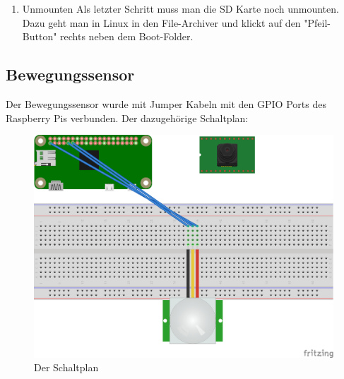 \begin{enumerate}
\begin{listing}
\begin{code}[firstnumber=last]{python}
            while sendmail() != True:
                try:
                    print("Trying ... ")
                except KeyboardInterrupt as e:
                    print("\nUser interrupt detected ...")
                    print("Email was not sent. Please check your connectivity!")
            break
        \end{code}
        \caption{Python script um eine email zu senden}
    \end{listing}

    Dieses Python File muss auch noch auf \textit{executable} gesetzt werden. Dazu:

    \begin{listing}
        \begin{code}[firstnumber=last]{sh}
            sudo chmod +x sendIP.py
        \end{code}
        \caption{Python datei als executable markieren}
    \end{listing}

    \item Unmounten
    Als letzter Schritt muss man die SD Karte noch unmounten. Dazu geht man in Linux in den File-Archiver und klickt auf den "Pfeil-Button" rechts neben dem Boot-Folder.
\end{enumerate}

\subsection{Bewegungssensor}
Der Bewegungssensor wurde mit Jumper Kabeln mit den GPIO Ports des Raspberry Pis verbunden. Der dazugehörige Schaltplan:
\begin{figure}
  \centering
    \includegraphics[width=\textwidth]{images/Schaltplan}
  \caption{Der Schaltplan}
\end{figure}

